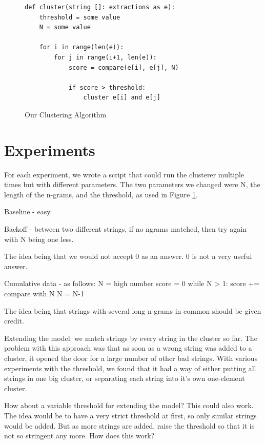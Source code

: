 \documentclass{article}
\begin{document}
\begin{figure}
\begin{verbatim}
def cluster(string []: extractions as e):
	threshold = some value
	N = some value

	for i in range(len(e)):
		for j in range(i+1, len(e)):
			score = compare(e[i], e[j], N)
			
			if score > threshold:
				cluster e[i] and e[j]
\end{verbatim}
\vspace{-20pt}
\caption{Our Clustering Algorithm}
\label{clustering}
\end{figure}


\section{Experiments}
For each experiment, we wrote a script that could run the clusterer multiple times but with different parameters. The two parameters we changed were N, the length of the n-grams, and the threshold, as used in Figure \ref{clustering}.




Baseline - easy.

Backoff - between two different strings, if no ngrams matched, then try again 
with N being one less.

The idea being that we would not accept 0 as an answer. 0 is not a very useful answer.

Cumulative data - as follows:
N = high number
score = 0
while N > 1:
	score += compare with N
 	N = N-1 

The idea being that strings with several long n-grams in common should be given credit. 


Extending the model: we match strings by every string in the cluster so far. 
The problem with this approach was that as soon as a wrong string was added to a cluster, it opened the door for a large number of other bad strings. With various experiments with the threshold, we found that it had a way of either putting all strings in one big cluster, or separating each string into it's own one-element cluster. 

How about a variable threshold for extending the model? This could also work. The idea would be to have a very strict threshold at first, so only similar strings would be added. But as more strings are added, raise the threshold so that it is not so stringent any more. How does this work?
\end{document}
